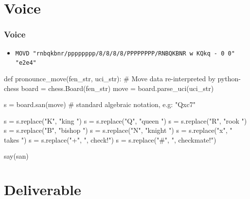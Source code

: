 \documentclass[t]{beamer}
\begin{document}
\section{Voice}

\begin{frame}[fragile]
\frametitle{Voice}

\begin{itemize}
    \item {\scriptsize \verb.MOVD "rnbqkbnr/pppppppp/8/8/8/8/PPPPPPPP/RNBQKBNR w KQkq - 0 0" "e2e4". }
\end{itemize}

\pause

\begin{lstpython}
def pronounce_move(fen_str, uci_str):
    # Move data re-interpreted by python-chess
    board = chess.Board(fen_str)
    move = board.parse_uci(uci_str)

    s = board.san(move) # standard algebraic notation, e.g: "Qxc7"

    s = s.replace("K", "king ")
    s = s.replace("Q", "queen ")
    s = s.replace("R", "rook ")
    s = s.replace("B", "bishop ")
    s = s.replace("N", "knight ")
    s = s.replace("x", " takes ")
    s = s.replace("+", ", check!")
    s = s.replace("#", ", checkmate!")

    say(san)
\end{lstpython}

\end{frame}

\section{Deliverable}
\end{document}
